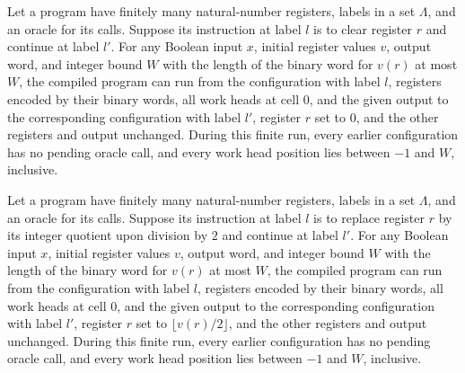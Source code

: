 \begin{lemma}
\label{Complexity.LogProg.sim_clr}
\leanok
{}
Let a program have finitely many natural-number registers, labels in a set $\Lambda$,
and an oracle for its calls. Suppose its instruction at label $l$ is to clear register
$r$ and continue at label $l'$. For any Boolean input $x$, initial register values $v$,
output word, and integer bound $W$ with the length of the binary word for $v(r)$ at most
$W$, the compiled program can run from the configuration with label $l$, registers
encoded by their binary words, all work heads at cell $0$, and the given output to the
corresponding configuration with label $l'$, register $r$ set to $0$, and the other
registers and output unchanged. During this finite run, every earlier configuration has
no pending oracle call, and every work head position lies between $-1$ and $W$,
inclusive.
\end{lemma}

\begin{lemma}
\label{Complexity.LogProg.sim_half}
\leanok
{}
Let a program have finitely many natural-number registers, labels in a set $\Lambda$,
and an oracle for its calls. Suppose its instruction at label $l$ is to replace register
$r$ by its integer quotient upon division by $2$ and continue at label $l'$. For any
Boolean input $x$, initial register values $v$, output word, and integer bound $W$ with
the length of the binary word for $v(r)$ at most $W$, the compiled program can run from
the configuration with label $l$, registers encoded by their binary words, all work
heads at cell $0$, and the given output to the corresponding configuration with label
$l'$, register $r$ set to $\lfloor v(r)/2\rfloor$, and the other registers and output
unchanged. During this finite run, every earlier configuration has no pending oracle
call, and every work head position lies between $-1$ and $W$, inclusive.
\end{lemma}

